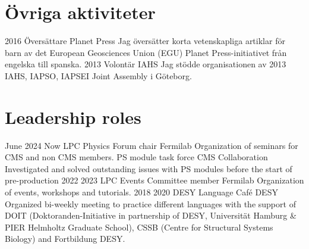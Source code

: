 \ifswedish
  \section{Övriga aktiviteter}
    \position
      {2016 \textemdash{}}
      {Översättare}
      {Planet Press}
      {Jag översätter korta vetenskapliga artiklar för barn av det European Geosciences Union (EGU) Planet Press-initiativet från engelska till spanska.}
    \position
      {2013}
      {Volontär}
      {IAHS}
      {Jag stödde organisationen av 2013 IAHS, IAPSO, IAPSEI Joint Assembly i Göteborg.}
\else
  \section{Leadership roles}
     \position
      {June 2024 \textemdash{} Now} 
      {LPC Physics Forum chair}
      {Fermilab}
      {Organization of seminars for CMS and non CMS members.}
      {PS module task force}
      {CMS Collaboration}
      {Investigated and solved outstanding issues with PS modules before the start of pre-production}
     \position
      {2022 \textemdash{} 2023} 
      {LPC Events Committee member}
      {Fermilab}
      {Organization of events, workshops and tutorials.}
    \position
      {2018 \textemdash{} 2020} 
      {DESY Language Café}
      {DESY}
      {Organized bi-weekly meeting to practice different languages with the support of DOIT (Doktoranden-Initiative in partnership of DESY, Universität Hamburg \&  PIER Helmholtz Graduate School), CSSB (Centre for Structural Systems Biology) and Fortbildung DESY.}
\fi
